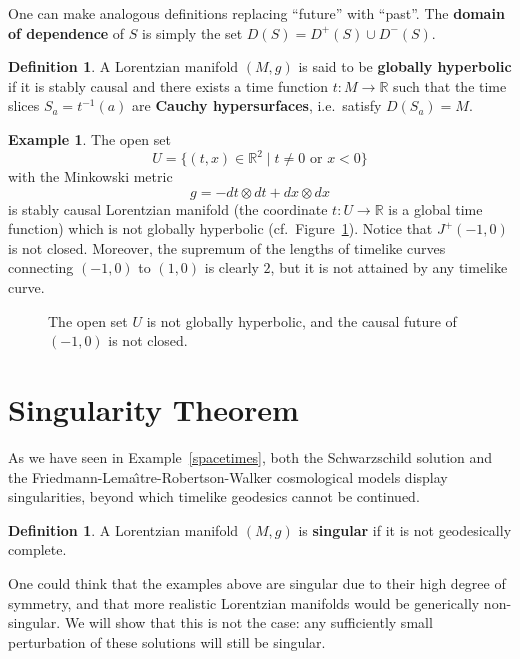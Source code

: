 \documentclass[10pt]{amsart}
\newcommand{\bbR}{\mathbb{R}}      %
\theoremstyle{definition}
\newtheorem{Def}[Thm]{Definition}
\newtheorem{Example}[Thm]{Example}
\theoremstyle{remark}
\begin{document}
One can make analogous definitions replacing ``future'' with ``past''. The {\bf domain of dependence} of $S$ is simply the set $D(S)=D^+(S)\cup D^-(S)$.

\begin{Def}
A Lorentzian manifold $(M,g)$ is said to be {\bf globally hyperbolic} if it is stably causal and there exists a time function $t:M \to \bbR$ such that the time slices $S_a = t^{-1}(a)$ are {\bf Cauchy hypersurfaces}, i.e.~satisfy $D(S_a)=M$.
\end{Def}

\begin{Example} \label{not_global_hyp}
The open set
\[
U = \{ (t,x) \in \bbR^2 \mid t \neq 0 \text{ or } x < 0 \}
\]
with the Minkowski metric
\[
g = - dt \otimes dt + dx \otimes dx
\]
is stably causal Lorentzian manifold (the coordinate $t:U \to \bbR$ is a global time function) which is not globally hyperbolic (cf.~Figure~\ref{Figure_not_gh}). Notice that $J^+(-1,0)$ is not closed. Moreover, the supremum of the lengths of timelike curves connecting $(-1,0)$ to $(1,0)$ is clearly $2$, but it is not attained by any timelike curve.
\end{Example}

\begin{figure}[h!]
\begin{center}
\textwidth
\leavevmode
{}
\end{center}
\caption{The open set $U$ is not globally hyperbolic, and the causal future of $(-1,0)$ is not closed.} \label{Figure_not_gh}
\end{figure}

%
%
%
\section{Singularity Theorem}
%
As we have seen in Example~\ref{spacetimes}, both the Schwarzschild solution and the Friedmann-Lema\^\i tre-Robertson-Walker cosmological models display singularities, beyond which timelike geodesics cannot be continued.

\begin{Def}
A Lorentzian manifold $(M,g)$ is {\bf singular} if it is not geodesically complete.
\end{Def}

One could think that the examples above are singular due to their high degree of symmetry, and that more realistic Lorentzian manifolds would be generically non-singular. We will show that this is not the case: any sufficiently small perturbation of these solutions will still be singular.
\end{document}
